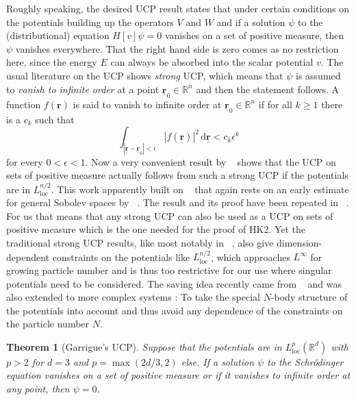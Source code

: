 \documentclass[journal=apcach,manuscript=article,layout=twocolumn]{achemso}
\newtheorem{theorem}{Theorem}
\newcommand{\R}{\mathbb{R}}
\newcommand{\rr}{\mathbf{r}}
\newcommand{\rrN}{\underline{\mathbf{r}}}
\newcommand{\loc}{\mathrm{loc}}
\begin{document}
Roughly speaking, the desired UCP result states that under certain conditions on the potentials building up the operators $V$ and $W$ and if a solution $\psi$
to the (distributional) equation $H[v]\psi=0$ vanishes on a set of positive measure, then $\psi$ vanishes everywhere. That the right hand side is zero comes as no restriction here, since the energy $E$ can always be absorbed into the scalar potential $v$.
The usual literature on the UCP shows \emph{strong} UCP, which means that $\psi$ is assumed to \emph{vanish to infinite order} at a point $\rrN_0\in\R^n$ and then the statement follows.
A function $f(\rr)$ is said to vanish to infinite order at $\rrN_0\in\R^n$ if for all $k\ge 1$ there is a $c_k$ such that
\begin{equation*}
     \int_{|\rrN-\rrN_0|<\epsilon} |f(\rrN)|^2\,\mathrm{d}\rrN < c_k \epsilon^k
\end{equation*}
%
for every $0 <\epsilon <1$. 
Now a very convenient result by \citeauthor{Regbaoui}~\cite{Regbaoui} shows that the UCP on sets of positive measure actually follows from such a strong UCP if the potentials are in $L^{n/2}_\loc$. This work apparently built on \citeauthor{deFigueiredoGossez}~\cite{deFigueiredoGossez} that again rests on an early estimate for general Sobolev spaces by \citeauthor{Ladyzenskaya1968}~\cite[Lemma 3.4]{Ladyzenskaya1968}.
The result and its proof have been repeated in \citeauthor{lammert2018search}~\cite{lammert2018search}. For us that means that any strong UCP can also be used as a UCP on sets of positive measure which is the one needed for the proof of HK2. Yet the traditional strong UCP results, like most notably in \citeauthor{jerison-kenig1985}~\cite{jerison-kenig1985}, also give dimension-dependent constraints on the potentials like $L^{n/2}_\loc$, which approaches $L^\infty$ for growing particle number and is thus too restrictive for our use where singular potentials need to be considered. The saving idea recently came from \citeauthor{Garrigue2018}~\cite{Garrigue2018} and was also extended to more complex systems \cite{Garrigue2019,Garrigue2019b}: To take the special $N$-body structure of the potentials into account and thus avoid any dependence of the constraints on the particle number $N$.

\begin{theorem}[Garrigue's UCP]
Suppose that the potentials are in $L_{\loc}^p(\R^d)$ with $p>2$ for $d=3$ and $p=\max(2d/3,2)$ else. If a solution $\psi$ to the Schr\"odinger equation vanishes on a set of positive measure or if it vanishes to infinite order at any point, then $\psi=0$.
\end{theorem}
\end{document}
